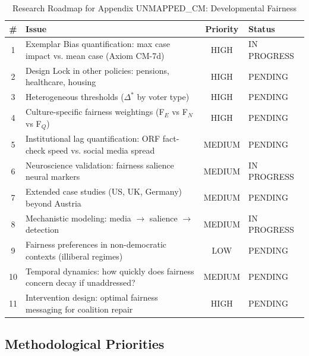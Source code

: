\begin{table}[htbp]
\centering
\caption{Research Roadmap for Appendix UNMAPPED_CM: Developmental Fairness}
\label{tab:cm-roadmap}
\renewcommand{\arraystretch}{1.3}
\begin{tabular}{@{}clcl@{}}
\toprule
\textbf{\#} & \textbf{Issue} & \textbf{Priority} & \textbf{Status} \\
\midrule
1 & Exemplar Bias quantification: max case impact vs. mean case (Axiom CM-7d) & HIGH & IN PROGRESS \\
2 & Design Lock in other policies: pensions, healthcare, housing & HIGH & PENDING \\
3 & Heterogeneous thresholds ($\Delta^*$ by voter type) & HIGH & PENDING \\
4 & Culture-specific fairness weightings (F$_E$ vs F$_N$ vs F$_Q$) & HIGH & PENDING \\
5 & Institutional lag quantification: ORF fact-check speed vs. social media spread & MEDIUM & PENDING \\
6 & Neuroscience validation: fairness salience neural markers & MEDIUM & IN PROGRESS \\
7 & Extended case studies (US, UK, Germany) beyond Austria & MEDIUM & PENDING \\
8 & Mechanistic modeling: media $\rightarrow$ salience $\rightarrow$ detection & MEDIUM & IN PROGRESS \\
9 & Fairness preferences in non-democratic contexts (illiberal regimes) & LOW & PENDING \\
10 & Temporal dynamics: how quickly does fairness concern decay if unaddressed? & MEDIUM & PENDING \\
11 & Intervention design: optimal fairness messaging for coalition repair & HIGH & PENDING \\
\bottomrule
\end{tabular}
\end{table}

\subsection{Methodological Priorities}

